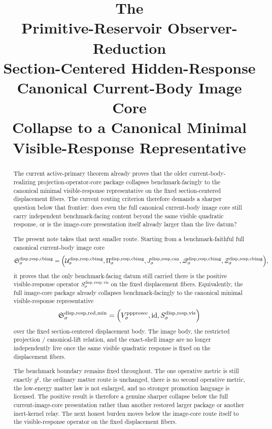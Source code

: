 \documentclass[11pt]{article}
\title{\textbf{The \TheoryName{}}\\[0.4em]
\large Primitive-Reservoir Observer-Reduction\\
\large Section-Centered Hidden-Response\\
\large Canonical Current-Body Image Core\\
\large Collapse to a Canonical Minimal\\
\large Visible-Response Representative}
\author{}
\date{}
\newcommand{\CompletedMetric}{g^{\sharp}}
\newcommand{\PrePreProtoSectionVertical}[1]{V_{#1}^{\mathrm{pppresec}}}
\newcommand{\CurrentBodyImageCore}{\mathfrak S^{\mathrm{disp,resp,cbimg}}}
\newcommand{\ImageProjection}[1]{\Pi_{#1}^{\mathrm{disp,resp,cbimg}}}
\newcommand{\CanonicalLift}[1]{J_{#1}^{\mathrm{disp,resp,can}}}
\newcommand{\CanonicalImageBody}[1]{\mathcal U_{#1}^{\mathrm{disp,resp,cbimg}}}
\newcommand{\CanonicalImageResponseLaw}[1]{\mathscr Q_{#1}^{\mathrm{disp,resp,cbimg}}}
\newcommand{\CanonicalImageShell}[1]{\mathcal Z_{#1}^{\mathrm{disp,resp,cbimg}}}
\newcommand{\VisibleResponseOperator}[1]{S_{#1}^{\mathrm{disp,resp,vis}}}
\newcommand{\MinimalReducedStructure}{\mathfrak S^{\mathrm{disp,resp,red,min}}}
\begin{document}
\maketitle

\begin{abstract}
The current active-primary theorem already proves that the older current-body-realizing projection-operator-core package collapses benchmark-facingly to the canonical minimal visible-response representative on the fixed section-centered displacement fibers. The current routing criterion therefore demands a sharper question below that frontier: does even the full canonical current-body image core still carry independent benchmark-facing content beyond the same visible quadratic response, or is the image-core presentation itself already larger than the live datum?

The present note takes that next smaller route. Starting from a benchmark-faithful full canonical current-body image core
\[
\CurrentBodyImageCore_{\sigma}
=
\Bigl(
\CanonicalImageBody{\sigma},
\ImageProjection{\sigma},
\CanonicalLift{\sigma},
\CanonicalImageResponseLaw{\sigma},
\CanonicalImageShell{\sigma}
\Bigr),
\]
it proves that the only benchmark-facing datum still carried there is the positive visible-response operator \(\VisibleResponseOperator{\sigma}\) on the fixed displacement fibers. Equivalently, the full image-core package already collapses benchmark-facingly to the canonical minimal visible-response representative
\[
\MinimalReducedStructure_{\sigma}
=
\Bigl(
\PrePreProtoSectionVertical{\sigma},
\mathrm{id},
\VisibleResponseOperator{\sigma}
\Bigr)
\]
over the fixed section-centered displacement body. The image body, the restricted projection / canonical-lift relation, and the exact-shell image are no longer independently live once the same visible quadratic response is fixed on the displacement fibers.

The benchmark boundary remains fixed throughout. The one operative metric is still exactly \(\CompletedMetric\), the ordinary matter route is unchanged, there is no second operative metric, the low-energy matter law is not enlarged, and no stronger promotion language is licensed. The positive result is therefore a genuine sharper collapse below the full current-image-core presentation rather than another restored larger package or another inert-kernel relay. The next honest burden moves below the image-core route itself to the visible-response operator on the fixed displacement fibers.
\end{abstract}
\end{document}
